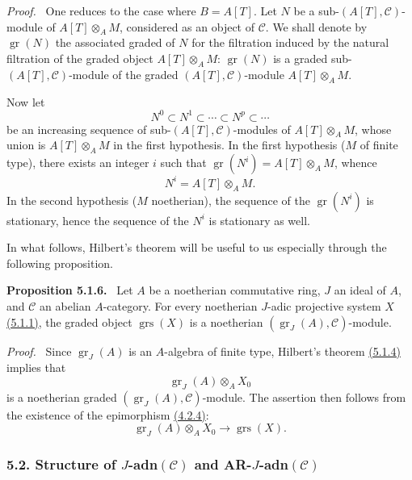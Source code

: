 \documentclass[11pt]{article}
\newenvironment{statement}[1]{\par\medskip\noindent\textbf{#1.}\ }{\par\medskip}
\newenvironment{prooftext}[1][Proof]{\par\noindent\emph{#1.}\ }{\par\medskip}
\providecommand{\gr}{\operatorname{gr}}
\providecommand{\gr}{\operatorname{gr}}
\providecommand{\gr}{\operatorname{gr}}
\providecommand{\grs}{\operatorname{grs}}
\begin{document}
\begin{prooftext}
One reduces to the case where \(B=A[T]\). Let \(N\) be a sub-\((A[T],\mathcal C)\)-module of \(A[T]\otimes_A M\), considered as an object of \(\mathcal C\). We shall denote by \(\gr(N)\) the associated graded of \(N\) for the filtration induced by the natural filtration of the graded object \(A[T]\otimes_A M\): \(\gr(N)\) is a graded sub-\((A[T],\mathcal C)\)-module of the graded \((A[T],\mathcal C)\)-module \(A[T]\otimes_A M\).

Now let
\[
N^0\subset N^1\subset\cdots\subset N^p\subset\cdots
\]
be an increasing sequence of sub-\((A[T],\mathcal C)\)-modules of \(A[T]\otimes_A M\), whose union is \(A[T]\otimes_A M\) in the first hypothesis. In the first hypothesis (\(M\) of finite type), there exists an integer \(i\) such that \(\gr(N^i)=A[T]\otimes_A M\), whence
\[
N^i=A[T]\otimes_A M.
\]
In the second hypothesis (\(M\) noetherian), the sequence of the \(\gr(N^i)\) is stationary, hence the sequence of the \(N^i\) is stationary as well.

In what follows, Hilbert's theorem will be useful to us especially through the following proposition.
\end{prooftext}

\label{sga5:V:proposition:5.1.6}\begin{statement}{Proposition 5.1.6}
Let \(A\) be a noetherian commutative ring, \(J\) an ideal of \(A\), and \(\mathcal C\) an abelian \(A\)-category. For every noetherian \(J\)-adic projective system \(X\) \hyperref[sga5:V:definition:5.1.1]{(5.1.1)}, the graded object \(\grs(X)\) is a noetherian \((\gr_J(A),\mathcal C)\)-module.
\end{statement}

\begin{prooftext}
Since \(\gr_J(A)\) is an \(A\)-algebra of finite type, Hilbert's theorem \hyperref[sga5:V:theorem:5.1.4]{(5.1.4)} implies that
\[
\gr_J(A)\otimes_A X_0
\]
is a noetherian graded \((\gr_J(A),\mathcal C)\)-module. The assertion then follows from the existence of the epimorphism \hyperref[sga5:V:lemma:4.2.4]{(4.2.4)}:
\[
\gr_J(A)\otimes_A X_0\longrightarrow \grs(X).
\]
\end{prooftext}

\subsubsection*{5.2. Structure of \(J\)-adn\((\mathcal C)\) and AR-\(J\)-adn\((\mathcal C)\)}\label{sga5:V:subsubsection:5.2}
\end{document}
